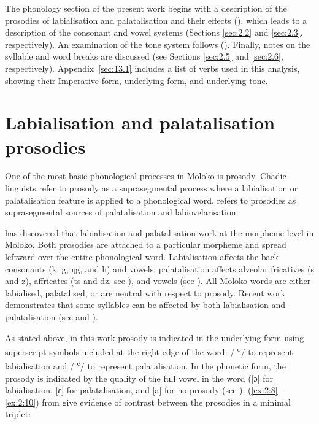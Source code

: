 The phonology section of the present work begins with a description of the prosodies of labialisation and palatalisation and their effects (), which leads to a description of the consonant and vowel systems (Sections \ref{sec:2.2} and \ref{sec:2.3}, respectively). An examination of the tone system follows (). Finally, notes on the syllable and word breaks are discussed (see Sections \ref{sec:2.5} and \ref{sec:2.6}, respectively). Appendix~\ref{sec:13.1} includes a list of verbs used in this analysis, showing their Imperative form, underlying form, and underlying tone.

\section{Labialisation and palatalisation prosodies}\label{sec:2.1}
\hypertarget{RefHeading1210421525720847}{}
One of the most basic phonological processes in Moloko is prosody.  Chadic linguists refer to prosody as a suprasegmental process where a labialisation or palatalisation feature is applied to a phonological word. \citet{Wolff1981} refers to prosodies as suprasegmental sources of palatalisation and labiovelarisation.

\citet{Bow1997c} has discovered that labialisation and palatalisation work at the morpheme level in Moloko. Both prosodies are attached to a particular morpheme and spread leftward over the entire phonological word. Labialisation affects the back consonants (k, g, ŋg, and h) and vowels; palatalisation affects alveolar fricatives (s and z), affricates (ts and dz, see ), and vowels (see ).  All Moloko words are either labialised, palatalised, or are neutral with respect to prosody. Recent work demonstrates that some syllables can be affected by both labialisation and palatalisation (see  and ).  

As stated above, in this work prosody is indicated in the underlying form using superscript symbols included at the right edge of the word: / \textsuperscript{o}/ to represent labialisation and / \textsuperscript{e}/ to represent palatalisation.  In the phonetic form, the prosody is indicated by the quality of the full vowel in the word ([ɔ] for labialisation, [ɛ] for palatalisation, and [a] for no  prosody (see ). (\ref{ex:2:8}--\ref{ex:2:10}) from \citet{Bow1997c} give evidence of contrast between the prosodies in a minimal triplet:


